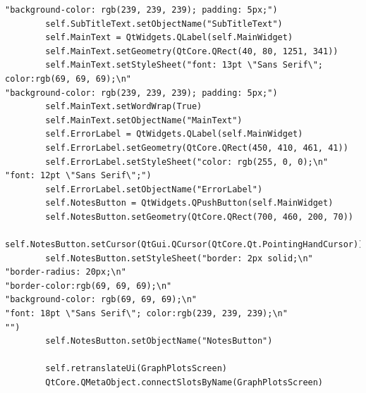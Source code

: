 \documentclass{article}
\begin{document}
\begin{lstlisting}
"background-color: rgb(239, 239, 239); padding: 5px;")
        self.SubTitleText.setObjectName("SubTitleText")
        self.MainText = QtWidgets.QLabel(self.MainWidget)
        self.MainText.setGeometry(QtCore.QRect(40, 80, 1251, 341))
        self.MainText.setStyleSheet("font: 13pt \"Sans Serif\"; color:rgb(69, 69, 69);\n"
"background-color: rgb(239, 239, 239); padding: 5px;")
        self.MainText.setWordWrap(True)
        self.MainText.setObjectName("MainText")
        self.ErrorLabel = QtWidgets.QLabel(self.MainWidget)
        self.ErrorLabel.setGeometry(QtCore.QRect(450, 410, 461, 41))
        self.ErrorLabel.setStyleSheet("color: rgb(255, 0, 0);\n"
"font: 12pt \"Sans Serif\";")
        self.ErrorLabel.setObjectName("ErrorLabel")
        self.NotesButton = QtWidgets.QPushButton(self.MainWidget)
        self.NotesButton.setGeometry(QtCore.QRect(700, 460, 200, 70))
        self.NotesButton.setCursor(QtGui.QCursor(QtCore.Qt.PointingHandCursor))
        self.NotesButton.setStyleSheet("border: 2px solid;\n"
"border-radius: 20px;\n"
"border-color:rgb(69, 69, 69);\n"
"background-color: rgb(69, 69, 69);\n"
"font: 18pt \"Sans Serif\"; color:rgb(239, 239, 239);\n"
"")
        self.NotesButton.setObjectName("NotesButton")

        self.retranslateUi(GraphPlotsScreen)
        QtCore.QMetaObject.connectSlotsByName(GraphPlotsScreen)


\end{lstlisting}
\end{document}
